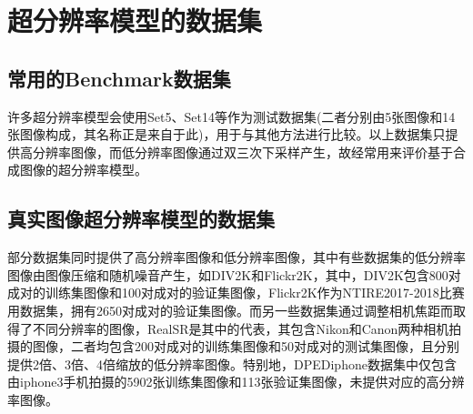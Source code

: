 \section{超分辨率模型的数据集}
\subsection{常用的Benchmark数据集}
许多超分辨率模型会使用Set5\parencite{Set5}、Set14\parencite{Set14}等作为测试数据集(二者分别由5张图像和14张图像构成，其名称正是来自于此)，用于与其他方法进行比较。以上数据集只提供高分辨率图像，而低分辨率图像通过双三次下采样产生，故经常用来评价基于合成图像的超分辨率模型。

\subsection{真实图像超分辨率模型的数据集}
部分数据集同时提供了高分辨率图像和低分辨率图像，其中有些数据集的低分辨率图像由图像压缩和随机噪音产生，如DIV2K\parencite{Agustsson_2017_CVPR_Workshops}和Flickr2K\parencite{timofte2017ntire}，其中，DIV2K包含800对成对的训练集图像和100对成对的验证集图像，Flickr2K作为NTIRE2017-2018比赛用数据集，拥有2650对成对的验证集图像。而另一些数据集通过调整相机焦距而取得了不同分辨率的图像，RealSR\parencite{cai2019toward}是其中的代表，其包含Nikon和Canon两种相机拍摄的图像，二者均包含200对成对的训练集图像和50对成对的测试集图像，且分别提供2倍、3倍、4倍缩放的低分辨率图像。特别地，DPEDiphone\parencite{ignatov2017dslr}数据集中仅包含由iphone3手机拍摄的5902张训练集图像和113张验证集图像，未提供对应的高分辨率图像。